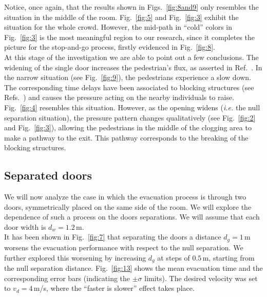 

{\color{red} Notice, once again, that the results shown in Figs.~\ref{fig:8and9} only resembles the 
situation in the middle of the room. Fig.~\ref{fig:5} and Fig.~\ref{fig:3} exhibit 
the situation for the whole crowd. However, the mid-path in ``cold'' colors in Fig.~\ref{fig:3} is
the most meaningful region to our research, since it completes the picture
for the stop-and-go process, firstly evidenced in Fig.~\ref{fig:8}.
}\\



At this stage of the investigation we are able to point out a few conclusions. 
The widening of the single door increases the pedestrian's flux, as asserted in 
Ref.~\cite{daoliang1}. In the narrow situation (see Fig.~\ref{fig:9}), 
the pedestrians experience a slow down. The corresponding time delays have been 
associated to blocking structures (see Refs.~\cite{Dorso1,Dorso2}) and causes 
the pressure acting on the nearby individuals to raise. Fig.~\ref{fig:4} 
resembles this situation. However, as the opening widens (\emph{i.e.} the null 
separation situation), the pressure pattern changes qualitatively (see 
Fig.~\ref{fig:2} and Fig.~\ref{fig:3}), allowing the pedestrians in the middle 
of the clogging area to make a pathway to the exit. This pathway corresponds to 
the breaking of the blocking structures.   \\

\subsection{\label{door_seperation} Separated doors}

We will now analyze the case in which the evacuation process is through two 
doors, symmetrically placed on the same side of the room. We will explore the 
dependence of such a process on the doors separations. We will assume that 
each door width is $d_w=1.2\,$m.  \\

It has been shown in Fig.~\ref{fig:7} that separating the doors a distance 
$d_g=1\,$m worsens the evacuation performance with respect to the null 
separation. We  further explored this worsening by increasing $d_g$ at steps of 
$0.5\,$m, starting from the null separation distance. Fig.~\ref{fig:13} shows 
the mean evacuation time and the corresponding error bars (indicating the 
$\pm\sigma$ limits). The desired velocity was set to $v_d=4\,$m/s, where the 
``faster is slower'' effect takes place. \\

